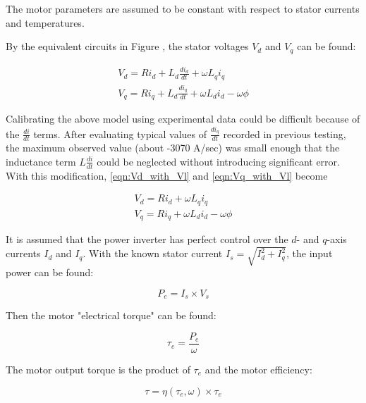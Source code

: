 \documentclass[../SimBALink.tex]{subfiles}
\begin{document}
		
		The motor parameters are assumed to be constant with respect to stator currents and temperatures.
		
		By the equivalent circuits in Figure , the stator voltages $V_d$ and $V_q$ can be found:
		
		\begin{gather}
			V_d		= R i_d + L_d \frac{ d i_d }{ d t } + \omega L_q i_q				\label{eqn:Vd_with_Vl}\\
			V_q		= R i_q + L_d \frac{ d i_q }{ d t } + \omega L_d i_d	- \omega \phi	\label{eqn:Vq_with_Vl}
		\end{gather}
		
		Calibrating the above model using experimental data could be difficult because of the $\frac{d i}{d t}$ terms. After evaluating typical values of $\frac{d i_q}{d t}$ recorded in previous testing, the maximum observed value (about -3070 A/sec) was small enough that the inductance term $L \frac{d i}{d t}$ could be neglected without introducing significant error. With this modification, \ref{eqn:Vd_with_Vl} and \ref{eqn:Vq_with_Vl} become
		
		\begin{gather}
			V_d		= R i_d + \omega L_q i_q				\label{eqn:Vd_without_Vl}\\
			V_q		= R i_q + \omega L_d i_d - \omega \phi		\label{eqn:Vq_without_Vl}
		\end{gather}
		
		It is assumed that the power inverter has perfect control over the $d$- and $q$-axis currents $I_d$ and $I_q$. With the known stator current $I_s = \sqrt{I_d^2 + I_q^2}$, the input power can be found:
		
		\begin{equation}
			P_e = I_s \times V_s
		\end{equation}
		
		Then the motor "electrical torque" can be found:
		
		\begin{equation}
			\tau_e = \frac{P_e}{\omega}
		\end{equation}
		
		The motor output torque is the product of $\tau_e$ and the motor efficiency:
		
		\begin{equation}
			\tau	=	\eta(\tau_e, \omega) \times \tau_e
		\end{equation}
\end{document}

